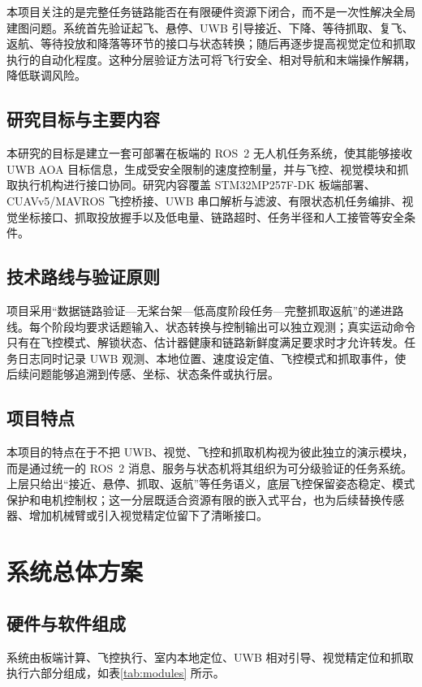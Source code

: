 \documentclass[12pt,a4paper]{ctexart}
\begin{document}
本项目关注的是完整任务链路能否在有限硬件资源下闭合，而不是一次性解决全局建图问题。系统首先验证起飞、悬停、UWB 引导接近、下降、等待抓取、复飞、返航、等待投放和降落等环节的接口与状态转换；随后再逐步提高视觉定位和抓取执行的自动化程度。这种分层验证方法可将飞行安全、相对导航和末端操作解耦，降低联调风险。

\subsection{研究目标与主要内容}
本研究的目标是建立一套可部署在板端的 ROS~2 无人机任务系统，使其能够接收 UWB AOA 目标信息，生成受安全限制的速度控制量，并与飞控、视觉模块和抓取执行机构进行接口协同。研究内容覆盖 STM32MP257F-DK 板端部署、CUAVv5/MAVROS 飞控桥接、UWB 串口解析与滤波、有限状态机任务编排、视觉坐标接口、抓取投放握手以及低电量、链路超时、任务半径和人工接管等安全条件。

\subsection{技术路线与验证原则}
项目采用“数据链路验证—无桨台架—低高度阶段任务—完整抓取返航”的递进路线。每个阶段均要求话题输入、状态转换与控制输出可以独立观测；真实运动命令只有在飞控模式、解锁状态、估计器健康和链路新鲜度满足要求时才允许转发。任务日志同时记录 UWB 观测、本地位置、速度设定值、飞控模式和抓取事件，使后续问题能够追溯到传感、坐标、状态条件或执行层。

\subsection{项目特点}
本项目的特点在于不把 UWB、视觉、飞控和抓取机构视为彼此独立的演示模块，而是通过统一的 ROS~2 消息、服务与状态机将其组织为可分级验证的任务系统。上层只给出“接近、悬停、抓取、返航”等任务语义，底层飞控保留姿态稳定、模式保护和电机控制权；这一分层既适合资源有限的嵌入式平台，也为后续替换传感器、增加机械臂或引入视觉精定位留下了清晰接口。

\clearpage
\section{系统总体方案}
\subsection{硬件与软件组成}
系统由板端计算、飞控执行、室内本地定位、UWB 相对引导、视觉精定位和抓取执行六部分组成，如表\ref{tab:modules} 所示。
\end{document}
